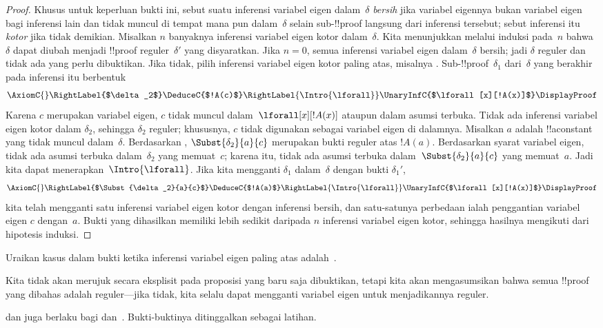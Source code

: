 \documentclass[../../../include/open-logic-section]{subfiles}
\begin{document}
\begin{proof}
Khusus untuk keperluan bukti ini, sebut suatu inferensi variabel eigen
dalam~$\delta$ \emph{bersih} jika variabel eigennya bukan variabel eigen
bagi inferensi lain dan tidak muncul di tempat mana pun dalam~$\delta$
selain sub-!!{proof} langsung dari inferensi tersebut; sebut inferensi itu
\emph{kotor} jika tidak demikian. Misalkan $n$ banyaknya inferensi
variabel eigen kotor dalam~$\delta$. Kita menunjukkan melalui induksi
pada~$n$ bahwa $\delta$ dapat diubah menjadi !!{proof} reguler~$\delta'$
yang disyaratkan. Jika $n=0$, semua inferensi variabel eigen
dalam~$\delta$ bersih; jadi $\delta$ reguler dan tidak ada yang perlu
dibuktikan. Jika tidak, pilih inferensi variabel eigen kotor paling atas,
misalnya \Intro{\lforall}. Sub-!!{proof}~$\delta_1$ dari~$\delta$ yang
berakhir pada inferensi itu berbentuk
    \[
    \AxiomC{}
    \RightLabel{$\delta_2$}
    \DeduceC{$!A(c)$}
    \RightLabel{\Intro{\lforall}}
    \UnaryInfC{$\lforall[x][!A(x)]$}
    \DisplayProof
    \]
Karena $c$ merupakan variabel eigen, $c$ tidak muncul
dalam~$\lforall[x][!A(x)]$ ataupun dalam asumsi terbuka. Tidak ada
inferensi variabel eigen kotor dalam $\delta_2$, sehingga $\delta_2$
reguler; khususnya, $c$ tidak digunakan sebagai variabel eigen di
dalamnya. Misalkan $a$ adalah !!a{constant} yang tidak muncul
dalam~$\delta$. Berdasarkan ,
$\Subst{\delta_2}{a}{c}$ merupakan bukti reguler atas $!A(a)$.
Berdasarkan syarat variabel eigen, tidak ada asumsi terbuka
dalam~$\delta_2$ yang memuat~$c$; karena itu, tidak ada asumsi terbuka
dalam~$\Subst{\delta_2}{a}{c}$ yang memuat~$a$. Jadi kita dapat
menerapkan~$\Intro{\lforall}$. Jika kita mengganti $\delta_1$
dalam~$\delta$ dengan bukti $\delta_1'$,
    \[
    \AxiomC{}
    \RightLabel{$\Subst{\delta_2}{a}{c}$}
    \DeduceC{$!A(a)$}
    \RightLabel{\Intro{\lforall}}
    \UnaryInfC{$\lforall[x][!A(x)]$}
    \DisplayProof
    \]
kita telah mengganti satu inferensi variabel eigen kotor dengan inferensi
bersih, dan satu-satunya perbedaan ialah penggantian variabel eigen $c$
dengan~$a$. Bukti yang dihasilkan memiliki lebih sedikit daripada $n$
inferensi variabel eigen kotor, sehingga hasilnya mengikuti dari hipotesis
induksi.
\end{proof}

\begin{prob}
Uraikan kasus dalam bukti  ketika inferensi variabel
eigen paling atas adalah~\Elim{\lexists}.
\end{prob}

Kita tidak akan merujuk secara eksplisit pada proposisi yang baru saja
dibuktikan, tetapi kita akan mengasumsikan bahwa semua !!{proof} yang
dibahas adalah reguler---jika tidak, kita selalu dapat mengganti variabel
eigen untuk menjadikannya reguler.

 dan  juga berlaku bagi
 dan~. Bukti-buktinya ditinggalkan sebagai latihan.
\end{document}
